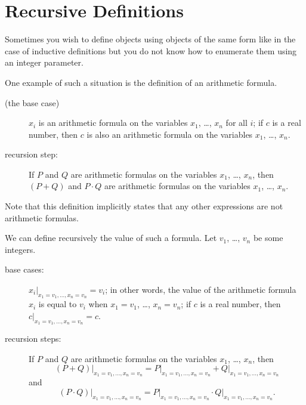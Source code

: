 \section{Recursive Definitions}
Sometimes you wish to define objects using objects of the same form like in the
case of inductive definitions but you do not know how to enumerate them using
an integer parameter.

One example of such a situation is the definition of an arithmetic formula.
\begin{description}
  \item [(the base case)] $x_i$ is an arithmetic formula on the variables $x_1$,
    \dots, $x_n$ for all $i$; if $c$ is a real number, then $c$ is also
    an arithmetic formula on the variables $x_1$, \dots, $x_n$.
  \item[recursion step:] If $P$ and $Q$ are arithmetic formulas on the variables
    $x_1$, \dots, $x_n$, then $(P + Q)$ and $P \cdot Q$ are arithmetic formulas
    on the variables $x_1$, \dots, $x_n$.
\end{description}
Note that this definition implicitly states that any other expressions are not
arithmetic formulas.

We can define recursively the value of such a formula. Let $v_1$, \dots, $v_n$
be some integers.
\begin{description}
  \item[base cases:] $x_i\big\rvert_{x_1 = v_1, \dots, x_n = v_n} = v_i$; in
    other words, the value of the arithmetic formula $x_i$ is equal to $v_i$
    when $x_1 = v_1$, \dots, $x_n = v_n$; if $c$ is a real number, then
    $c\rvert_{x_1 = v_1, \dots, x_n = v_n} = c$.
  \item[recursion steps:] If $P$ and $Q$ are arithmetic formulas on the
    variables $x_1$, \dots, $x_n$, then
    \[
      (P + Q)\big\rvert_{x_1 = v_1, \dots, x_n = v_n} =
      P\big\rvert_{x_1 = v_1, \dots, x_n = v_n} +
      Q\big\rvert_{x_1 = v_1, \dots, x_n = v_n}
    \]
    and
    \[
      (P \cdot Q)\big\rvert_{x_1 = v_1, \dots, x_n = v_n} =
      P\big\rvert_{x_1 = v_1, \dots, x_n = v_n} \cdot
      Q\big\rvert_{x_1 = v_1, \dots, x_n = v_n}.
    \]
\end{description}

